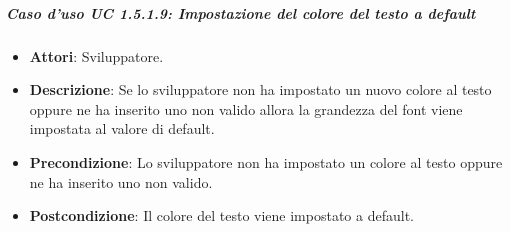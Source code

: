 \subparagraph{Caso d'uso UC 1.5.1.9: Impostazione del colore del testo a default}


\FloatBarrier
\begin{itemize}
\item\textbf{Attori}: Sviluppatore.
\item\textbf{Descrizione}: Se lo sviluppatore non ha impostato un nuovo colore al testo oppure ne ha inserito uno non valido allora la grandezza del font viene impostata al valore di default.
\item\textbf{Precondizione}: Lo sviluppatore non ha impostato un colore al testo oppure ne ha inserito uno non valido.
\item\textbf{Postcondizione}: Il colore del testo viene impostato a default.

\end{itemize}

